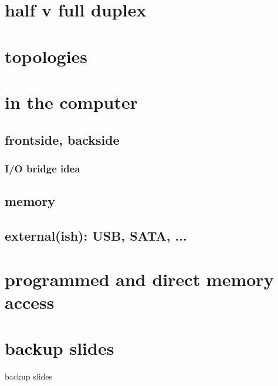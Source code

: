 \date{}
\title{}
\date{}

\begin{frame}
    \titlepage
\end{frame}

\section{half v full duplex}



\section{topologies}




\section{in the computer}



\subsection{frontside, backside}

\subsubsection{I/O bridge idea}

\subsection{memory}

\subsection{external(ish): USB, SATA, ...}

\section{programmed and direct memory access}


\section{backup slides}
\begin{frame}{backup slides}
\end{frame}


